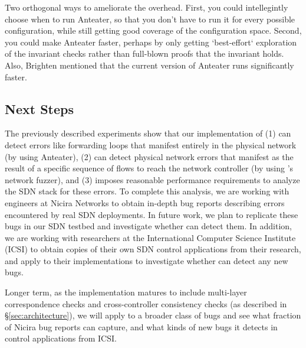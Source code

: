     Two orthogonal ways to ameliorate the overhead. First, you could intellegintly choose
    when to run Anteater, so that you don't have to run it for every possible
    configuration, while still getting good coverage of the
    configuration space. Second, you could make Anteater faster, perhaps by only
    getting `best-effort` exploration of the invariant checks rather than
    full-blown proofs that the invariant holds. Also, Brighten mentioned that the
    current version of Anteater runs significantly faster.

    \subsection{Next Steps}
        The previously described experiments show that our implementation of \projectname{} (1) can detect errors like forwarding loops that manifest entirely in the physical network (by using Anteater), (2) can detect physical network errors that manifest as the result of a specific sequence of flows to reach the network controller (by using \projectname{}'s network fuzzer), and (3) imposes reasonable performance requirements to analyze the SDN stack for these errors.
        To complete this analysis, we are working with engineers at Nicira Networks to obtain in-depth bug reports describing errors encountered by real SDN deployments.
        In future work, we plan to replicate these bugs in our SDN testbed and investigate whether \projectname{} can detect them.
        In addition, we are working with researchers at the International Computer Science Institute (ICSI) to obtain copies of their own SDN control applications from their research, and apply \projectname{} to their implementations to investigate whether \projectname{} can detect any new bugs.

        Longer term, as the \projectname{} implementation matures to include multi-layer correspondence checks and cross-controller consistency checks (as described in \S\ref{sec:architecture}), we will apply \projectname{} to a broader class of bugs and see what fraction of Nicira bug reports \projectname{} can capture, and what kinds of new bugs it detects in control applications from ICSI. 


